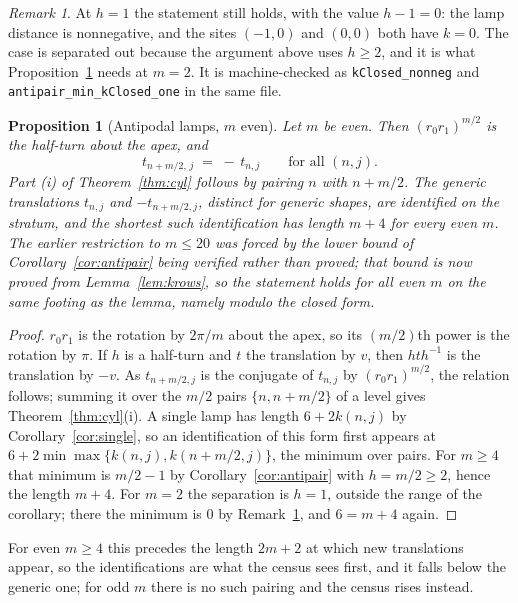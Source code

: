 \documentclass[11pt]{article}
\newtheorem{proposition}[theorem]{Proposition}
\theoremstyle{definition}
\theoremstyle{remark}
\newtheorem{remark}[theorem]{Remark}
\begin{document}
\begin{remark}\label{rem:antipair-one}
At $h=1$ the statement still holds, with the value $h-1=0$: the lamp distance is
nonnegative, and the sites $(-1,0)$ and $(0,0)$ both have $k=0$. The case is
separated out because the argument above uses $h\ge2$, and it is what
Proposition~\ref{prop:antipodal} needs at $m=2$. It is machine-checked as
\texttt{kClosed\_nonneg} and \texttt{antipair\_min\_kClosed\_one} in the same
file.
\end{remark}

\begin{proposition}[Antipodal lamps, $m$ even]\label{prop:antipodal}
Let $m$ be even. Then $(r_0r_1)^{m/2}$ is the half-turn about the apex, and
\[
 t_{n+m/2,\,j}\;=\;-\,t_{n,j}\qquad\text{for all }(n,j).
\]
Part (i) of Theorem~\ref{thm:cyl} follows by pairing $n$ with $n+m/2$. The
generic translations $t_{n,j}$ and $-t_{n+m/2,j}$, distinct for generic shapes,
are identified on the stratum, and the shortest such identification has length $m+4$ for every
even $m$. The earlier restriction to $m\le20$ was forced by the lower bound of
Corollary~\ref{cor:antipair} being verified rather than proved; that bound is now proved from
Lemma~\ref{lem:krows}, so the statement holds for all even $m$ on the same footing as the
lemma, namely modulo the closed form.
\end{proposition}

\begin{proof}
$r_0r_1$ is the rotation by $2\pi/m$ about the apex, so its $(m/2)$th power is
the rotation by $\pi$. If $h$ is a half-turn and $t$ the translation by $v$,
then $hth^{-1}$ is the translation by $-v$. As $t_{n+m/2,j}$ is the conjugate
of $t_{n,j}$ by $(r_0r_1)^{m/2}$, the relation follows; summing it over the
$m/2$ pairs $\{n,n+m/2\}$ of a level gives Theorem~\ref{thm:cyl}(i). A single
lamp has length $6+2k(n,j)$ by Corollary~\ref{cor:single}, so an identification
of this form first appears at $6+2\min\max\{k(n,j),k(n+m/2,j)\}$, the minimum
over pairs. For $m\ge4$ that minimum is $m/2-1$ by
Corollary~\ref{cor:antipair} with $h=m/2\ge2$, hence the length $m+4$. For $m=2$
the separation is $h=1$, outside the range of the corollary; there the minimum
is $0$ by Remark~\ref{rem:antipair-one}, and $6=m+4$ again.
\end{proof}

For even $m\ge4$ this precedes the length $2m+2$ at which new translations
appear, so the identifications are what the census sees first, and it falls
below the generic one; for odd $m$ there is no such pairing and the census
rises instead.
\end{document}
